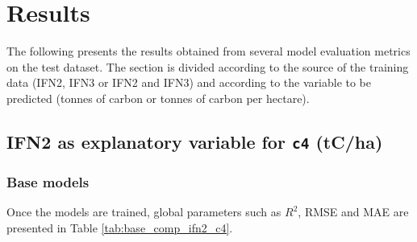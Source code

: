 \section{Results}\label{anexo:resultados}

The following presents the results obtained from several model evaluation metrics on the test dataset. The section is divided according to the source of the training data (IFN2, IFN3 or IFN2 and IFN3) and according to the variable to be predicted (tonnes of carbon or tonnes of carbon per hectare).

\subsection{IFN2 as explanatory variable for \texttt{c4} (tC/ha)}

\subsubsection{Base models}

Once the models are trained, global parameters such as $R^2$, RMSE and MAE are presented in Table \ref{tab:base_comp_ifn2_c4}.

